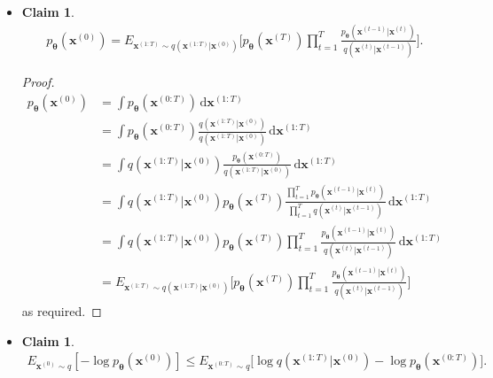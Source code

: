 \documentclass[10pt]{article}
\newtheorem{claim}[lemma]{Claim}
\newcommand{\dee}{\mathrm{d}}
\newcommand{\ve}[1]{\mathbf{#1}}
\newcommand{\ves}[1]{\boldsymbol{#1}}
\begin{document}
\begin{itemize}
  \item \begin{claim} \label{ddpm-backward-process-probability-rewrite}
  \begin{align*}
  p_{\ves{\theta}}(\ve{x}^{(0)}) = E_{\ve{x}^{(1:T)} \sim q(\ve{x}^{(1:T)}|\ve{x}^{(0)})} \bigg[ p_{\ves{\theta}}(\ve{x}^{(T)}) \prod_{t=1}^T \frac{ p_{\ves{\theta}}(\ve{x}^{(t-1)}|\ve{x}^{(t)})}{ q(\ve{x}^{(t)}|\ve{x}^{(t-1)})} \bigg].
  \end{align*}
\end{claim}

\begin{proof}
  \begin{align*}
    p_{\ves{\theta}}(\ve{x}^{(0)}) 
    &= \int p_{\ves{\theta}}(\ve{x}^{(0:T) })\, \dee\ve{x}^{(1:T)} \\
    &= \int p_{\ves{\theta}}(\ve{x}^{(0:T) }) \frac{q(\ve{x}^{(1:T)}|\ve{x}^{(0)})}{q(\ve{x}^{(1:T)}|\ve{x}^{(0)})}\, \dee\ve{x}^{(1:T)} \\
    &= \int q(\ve{x}^{(1:T)}|\ve{x}^{(0)}) \frac{p_{\ves{\theta}}(\ve{x}^{(0:T) })}{q(\ve{x}^{(1:T)}|\ve{x}^{(0)})}\, \dee\ve{x}^{(1:T)}\\
    &= \int q(\ve{x}^{(1:T)}|\ve{x}^{(0)}) p_{\ves{\theta}}(\ve{x}^{(T)}) \frac{\prod_{t=1}^T p_{\ves{\theta}}(\ve{x}^{(t-1)}|\ve{x}^{(t)})}{\prod_{t=1}^T q(\ve{x}^{(t)}|\ve{x}^{(t-1)})}\, \dee\ve{x}^{(1:T)}\\
    &= \int q(\ve{x}^{(1:T)}|\ve{x}^{(0)}) p_{\ves{\theta}}(\ve{x}^{(T)}) \prod_{t=1}^T \frac{ p_{\ves{\theta}}(\ve{x}^{(t-1)}|\ve{x}^{(t)})}{ q(\ve{x}^{(t)}|\ve{x}^{(t-1)})}\, \dee\ve{x}^{(1:T)} \\
    &= E_{\ve{x}^{(1:T)} \sim q(\ve{x}^{(1:T)}|\ve{x}^{(0)})} \bigg[ p_{\ves{\theta}}(\ve{x}^{(T)}) \prod_{t=1}^T \frac{ p_{\ves{\theta}}(\ve{x}^{(t-1)}|\ve{x}^{(t)})}{ q(\ve{x}^{(t)}|\ve{x}^{(t-1)})} \bigg]
  \end{align*}
  as required.
\end{proof}

\item \begin{claim} \label{ddpm-elbo-claim}
\begin{align*}
  E_{\ve{x}^{(0)} \sim q} [-\log p_{\ves{\theta}}(\ve{x}^{(0)})] \leq E_{\ve{x}^{(0:T)} \sim q}\Big[ \log q(\ve{x}^{(1:T)}|\ve{x}^{(0)}) - \log p_{\ves{\theta}}(\ve{x}^{(0:T)}) \Big].
\end{align*}
\end{claim}


\end{itemize}
\end{document}

